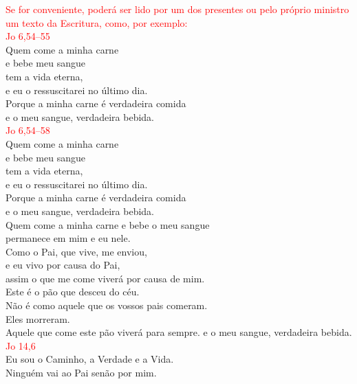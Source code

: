 \documentclass{book}
\begin{document}
\begin{flushleft}
    \textcolor{red}{Se for conveniente, poderá ser lido por um dos presentes ou pelo próprio ministro um texto da Escritura, como, por exemplo:}
    \vspace{.1cm} \\
    \textcolor{red}{Jo 6,54--55}
    \vspace{.1cm} \\
    Quem come a minha carne \\
    e bebe meu sangue \\
    tem a vida eterna, \\
    e eu o ressuscitarei no último dia. \\
    Porque a minha carne é verdadeira comida \\
    e o meu sangue, verdadeira bebida.
    \vspace{.1cm} \\
    \textcolor{red}{Jo 6,54--58}
    \vspace{.1cm} \\
    Quem come a minha carne \\
    e bebe meu sangue \\
    tem a vida eterna, \\
    e eu o ressuscitarei no último dia. \\
    Porque a minha carne é verdadeira comida \\
    e o meu sangue, verdadeira bebida. \\
    Quem come a minha carne e bebe o meu sangue \\
    permanece em mim e eu nele. \\
    Como o Pai, que vive, me enviou, \\
    e eu vivo por causa do Pai, \\
    assim o que me come viverá por causa de mim. \\
    Este é o pão que desceu do céu. \\
    Não é como aquele que os vossos pais comeram. \\
    Eles morreram. \\
    Aquele que come este pão viverá para sempre.
    e o meu sangue, verdadeira bebida.
    \vspace{.1cm} \\
    \textcolor{red}{Jo 14,6}
    \vspace{.1cm} \\
    Eu sou o Caminho, a Verdade e a Vida. \\
    Ninguém vai ao Pai senão por mim.

\end{flushleft}
\end{document}
